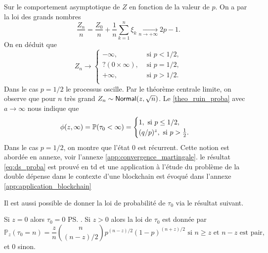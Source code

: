 \begin{remark}
Sur le comportement asymptotique de $Z$ en fonction de la valeur de $p$. On a par la loi des grands nombres
$$
\frac{Z_n}{n}=\frac{Z_0}{n}+\frac{1}{n}\sum_{k=1}^{n}\xi_k\underset{n\rightarrow+\infty}{\longrightarrow} 2p-1.
$$
On en déduit que
$$
Z_n\rightarrow\begin{cases}
-\infty,&\text{ si }p<1/2,\\
? (0\times \infty),&\text{ si }p=1/2,\\
+\infty,&\text{ si }p>1/2.\\
\end{cases}
$$
Dans le cas $p=1/2$ le processus oscille. Par le théorème centrale limite, on observe que pour $n$ très grand $Z_n\sim\mathsf{Normal}(z, \sqrt{n})$. Le \cref{theo_ruin_proba} avec $a\rightarrow \infty$ nous indique que 
\begin{equation}\label{eq:ds_proba}
\phi(z, \infty) = \mathbb{P}(\tau_0 < \infty)=\begin{cases}
1,\text{ si }p\leq 1/2,\\
(q/p)^z,\text{ si } p> \frac 12.
\end{cases}
\end{equation}
Dans le cas $p=1/2$, on montre que l'état $0$ est récurrent. Cette notion est abordée en annexe, voir l'annexe \ref{app:convergence_martingale}. le résultat \eqref{eq:ds_proba} est prouvé en td et une application à l'étude du problème de la double dépense dans le contexte d'une blockchain est évoqué dans l'annexe \ref{app:application_blockchain}
\end{remark}
Il est aussi possible de donner la loi de probabilité de $\tau_0$ via le résultat suivant.
\begin{theo}
Si $z = 0$ alors $\tau_0=0$ \ps. Si $z>0$ alors la loi de $\tau_0$ est donnée par
$$
\mathbb{P}_z(\tau_0 = n)=
\frac{z}{n}\binom{n}{(n-z) / 2}p^{(n-z) / 2}(1-p)^{(n
+z) / 2}\text{ si }n\geq z\text{ et }n-z\text{ est pair},
$$
et $0$ sinon.
\end{theo}
